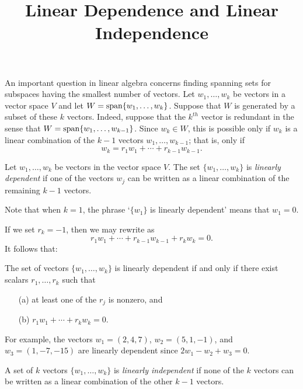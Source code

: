 \documentclass{ximera}
\title{Linear Dependence and Linear Independence}
\begin{document}
\begin{abstract}
\end{abstract}
\maketitle

 \label{S:5.4}

An important question in linear algebra concerns finding spanning
sets for subspaces having the smallest
number of vectors. Let $w_1,\ldots,w_k$ be vectors in a vector
space $V$ and let $W={\rm span}\{w_1,\ldots,w_k\}$.  
Suppose that $W$ is generated by a subset of these $k$ vectors.
Indeed, suppose that the $k^{th}$ vector is redundant in the
sense that $W={\rm span}\{w_1,\ldots,w_{k-1}\}$.  Since $w_k\in W$,
this is possible only if $w_k$ is a linear combination of the
$k-1$ vectors $w_1,\ldots,w_{k-1}$; that is, only if
\begin{equation}  \label{e:depend}
w_k = r_1w_1 + \cdots + r_{k-1}w_{k-1}.
\end{equation}
\begin{definition}  \label{lineardependence}
Let $w_1,\ldots,w_k$ be vectors in the vector space $V$.  The set
$\{w_1,\ldots,w_k\}$ is {\em linearly dependent\/} if one of the vectors
$w_j$ can be written as a linear combination of the remaining $k-1$ vectors.
\end{definition}  
Note that when $k=1$, the phrase `$\{w_1\}$ is linearly dependent'
means that $w_1=0$.

If we set $r_k=-1$, then we may rewrite  as
\[
r_1w_1 + \cdots + r_{k-1}w_{k-1} + r_k w_k =0.
\]
It follows that:
\begin{lemma}  \label{L:lindep}
The set of vectors $\{w_1,\ldots,w_k\}$ is linearly dependent if and
only if there exist scalars $r_1,\ldots,r_k$ such that
\begin{itemize}
\item[(a)]   at least one of the $r_j$ is nonzero, and
\item[(b)]   $r_1w_1 + \cdots + r_k w_k =0.$
\end{itemize}
\end{lemma}

For example, the vectors $w_1=(2,4,7)$, $w_2=(5,1,-1)$, and
$w_3=(1,-7,-15)$ are linearly dependent since $2w_1-w_2+w_3=0$.

\begin{definition}  \label{linearindependence}
A set of $k$ vectors $\{w_1,\ldots,w_k\}$ is {\em linearly
independent\/} if none of the $k$ vectors can be written as a
linear combination of the other $k-1$ vectors.
\end{definition} 
\end{document}
